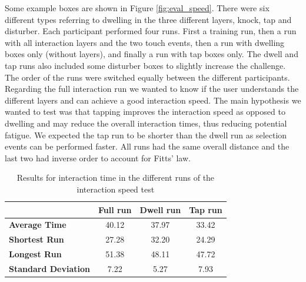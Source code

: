 Some example boxes are shown in Figure \ref{fig:eval_speed}. There were six different types referring to dwelling in the three different layers, knock, tap and disturber. Each participant performed four runs. First a training run, then a run with all interaction layers and the two touch events, then a run with dwelling boxes only (without layers), and finally a run with tap boxes only. The dwell and tap runs also included some disturber boxes to slightly increase the challenge. The order of the runs were switched equally between the different participants. Regarding the full interaction run we wanted to know if the user understands the different layers and can achieve a good interaction speed. The main hypothesis we wanted to test was that tapping improves the interaction speed as opposed to dwelling and may reduce the overall interaction times, thus reducing potential fatigue. We expected the tap run to be shorter than the dwell run as selection events can be performed faster. All runs had the same overall distance and the last two had inverse order to account for Fitts’ law.

\begin{table}[htbp]
  \centering
  \caption{Results for interaction time in the different runs of the interaction speed test}
    \begin{tabular}{lccc}
    \toprule
          & \textbf{Full run} & \textbf{Dwell run} & \textbf{Tap run} \\
    \midrule
    \textbf{Average Time} & 40.12 & 37.97 & 33.42 \\
    \textbf{Shortest Run} & 27.28 & 32.20 & 24.29 \\
    \textbf{Longest Run} & 51.38 & 48.11 & 47.72 \\
    \textbf{Standard Deviation} & 7.22 & 5.27 & 7.93 \\
    \bottomrule
    \end{tabular}%
  \label{tab:prot_captap_eval_intspeed}%
\end{table}%

